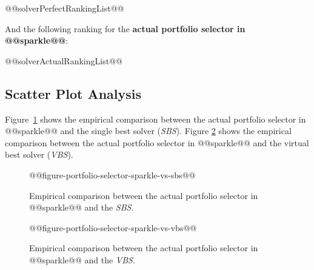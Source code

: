 \documentclass[british]{article}
\newif\iftest
\begin{document}
\begin{enumerate} 
@@solverPerfectRankingList@@
\end{enumerate}

And the following ranking for the \textbf{actual portfolio selector in @@sparkle@@}:

\begin{enumerate} 
@@solverActualRankingList@@
\end{enumerate}


\subsection{Scatter Plot Analysis}

Figure~\ref{fig:sparkle_vs_sbs} shows the empirical comparison between the actual portfolio selector in @@sparkle@@ and the single best solver (\emph{SBS}).
Figure \ref{fig:sparkle_vs_vbs} shows the empirical comparison between the actual portfolio selector in @@sparkle@@ and the virtual best solver (\emph{VBS}).

\begin{figure}[htbp]
\noindent \begin{centering}
@@figure-portfolio-selector-sparkle-vs-sbs@@
\par\end{centering}

\caption{Empirical comparison between the actual portfolio selector in @@sparkle@@ and the \emph{SBS}.}\label{fig:sparkle_vs_sbs}
\end{figure}

\begin{figure}[htbp]
\noindent \begin{centering}
@@figure-portfolio-selector-sparkle-vs-vbs@@
\par\end{centering}

\caption{Empirical comparison between the actual portfolio selector in @@sparkle@@ and the \emph{VBS}.}\label{fig:sparkle_vs_vbs}
\end{figure}


\iftest
\section{Experimental Results on the Test Set}
\label{sec:Experimental_Results_Test}

In this section, the PAR10 results for the current portfolio selector in @@sparkle@@ on solving the test instance set @@testInstanceClass@@ is reported.

\begin{itemize}
\item \textbf{Actual Portfolio Selector in @@sparkle@@}, PAR10: @@testActualPAR10@@
\end{itemize}
\fi




\end{document}
